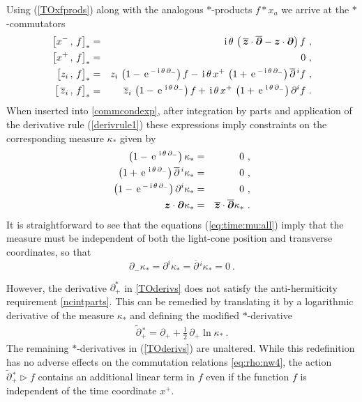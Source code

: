 \documentclass[11pt,a4paper]{article}
\newcommand{\cb}[2]{\bigl[#1\,,\,#2\bigr]}                 %
\def\nn{\nonumber}
\def\d{\partial}
\def\bfd{{\mbf\partial}}
\def\bfz{{\mbf z}}
\def\od{\overline{\partial}}
\def\oz{\overline{z}}
\def\obfd{\overline{\mbf\partial}}
\def\obfz{\overline{\mbf z}}
\newcommand{\1}{\mathbb{1}}
\newcommand{\mbf}[1]{{\boldsymbol {#1} }}
\def\ii{{\,{\rm i}\,}}
\def\nn{\nonumber}
\def\e{{\,\rm e}\,}
\def\d{\partial}
\newcommand{\beq}{\begin{eqnarray}}
\newcommand{\eeq}{\end{eqnarray}}
\begin{document}
Using (\ref{TOxfprods}) along with the analogous $*$-products $f*x_a$
we arrive at the $*$-commutators
\begin{eqnarray}
 \cb{x^-}{f}_\ast&=&\ii\theta\,\left(\,\obfz\cdot\obfd
    -\bfz\cdot\bfd\right)f \ , \nn \\ \nn
  \cb{x^+}{f}_\ast&=&0 \ , \\ \nn
  \cb{z_i}{f}_\ast&=&z_i\,\left(1
    -\e^{-\ii\theta\,\d_-}\right)f-\ii\theta\,x^+\,\left(1
    +\e^{-\ii\theta\,\d_-}\right)\od{}^{\,i}f \ , \\
  \cb{\,\oz_i}{f}_\ast&=&\oz_i\,\left(1
    -\e^{\ii\theta\,\d_-}\right)f+\ii\theta\,x^+\,\left(1
    +\e^{\ii\theta\,\d_-}\right)\d^if \ .
\label{eq:time:comm}\end{eqnarray}
When inserted into \eqref{commcondexp}, after integration by parts and
application of the derivative rule (\ref{derivrule1})
these expressions imply constraints on the corresponding measure
$\kappa_\ast$ given by
\begin{eqnarray}
\left(1-\e^{\ii\theta\,\d_-}\right)\kappa_\ast&=&0 \ , \nn \\
\left(1+\e^{\ii\theta\,\d_-}\right)\od{}^{\,i}\kappa_\ast&=&0 \ , \nn \\ \nn
\left(1-\e^{-\ii\theta\,\d_-}\right)\d^i\kappa_\ast&=&0 \ , \\
  \bfz\cdot\bfd\kappa_\ast&=&\obfz\cdot\obfd\kappa_\ast \ .
 \label{eq:time:mu:all}\end{eqnarray}
It is straightforward to see that the equations (\ref{eq:time:mu:all})
imply that the measure must be independent of both the light-cone
position and transverse coordinates, so that
\begin{equation}
  \label{eq:time:mu}
  \partial_-\kappa_\ast=\d^i\kappa_\ast=\od{}^{\,i}\kappa_\ast=0 \ .
\end{equation}

However, the derivative $\d_+^\ast$ in \eqref{TOderivs} does not
satisfy the anti-hermiticity requirement \eqref{ncintparts}. This can be
remedied by translating it by a logarithmic derivative of the measure
$\kappa_*$ and defining the modified $*$-derivative
\beq
  \label{eq:time:d}
 \widetilde\d{}^{\,\ast}_+=\d_+ + \mbox{$\frac12$}\,\d_+\ln\kappa_\ast \ .
\eeq
The remaining $*$-derivatives in (\ref{TOderivs}) are unaltered. While
this redefinition has no adverse effects on the commutation relations
\eqref{eq:rho:nw4}, the action
$\widetilde\d{}^{\,\ast}_+\triangleright f$ contains an additional
linear term in $f$ even if the function $f$ is independent of the time
coordinate $x^+$.
\end{document}
